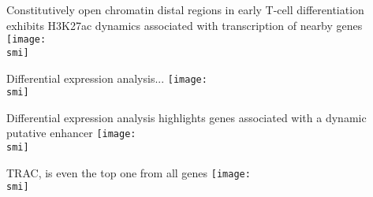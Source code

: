 \documentclass[10pt]{beamer}
\def\smi{out/ln/updir/mw-gcthesis-oral/library.bib}
\begin{document}
\begin{frame}{Constitutively open chromatin distal regions in early T-cell differentiation exhibits H3K27ac dynamics associated with transcription of nearby genes}
  \def\smi{out/ln/updir/mw-gcthesis-oral/ink/atac-clusters/rnaseq-h3k27ac-with-casero.pdf}
  \texttt{[image: \\smi]}
\end{frame}
\begin{frame}{Differential expression analysis...}
  \def\smi{out/ln/updir/mw-gcthesis-oral/ink/atac-clusters/casero-violin-barplot.pdf}
  \texttt{[image: \\smi]}
\end{frame}
\begin{frame}{Differential expression analysis highlights genes associated with a dynamic putative enhancer}
  \def\smi{out/ln/updir/mw-gcthesis-oral/ink/atac-clusters/casero-violin-barplot-top-fc.pdf}
  \texttt{[image: \\smi]}
\end{frame}
\begin{frame}{TRAC, is even the top one from all genes}
  \def\smi{out/ln/updir/mw-gcthesis-oral/ink/casero-dear.pdf}
  \texttt{[image: \\smi]}%
\end{frame}
\end{document}

